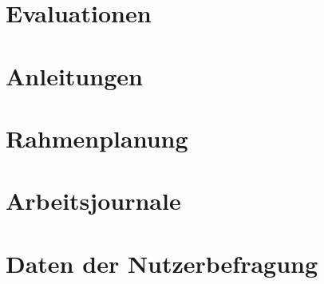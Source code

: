 \documentclass[a4paper]{scrreprt}
\begin{document}
\newpage

\chapter*{Evaluationen}



\chapter*{Anleitungen}



\chapter*{Rahmenplanung}



\chapter*{Arbeitsjournale}




\chapter*{Daten der Nutzerbefragung}


\end{document}

